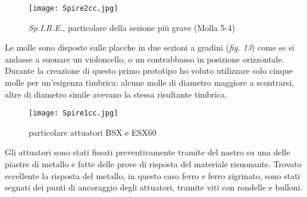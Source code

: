 \begin{figure}[htbp]
\begin{center}
\texttt{[image: Spire2cc.jpg]}
\caption{\textit{Sp.I.R.E.}, particolare della sezione più grave (Molla 5-4)}
\label{default}
\end{center}
\end{figure}

Le molle sono disposte sulle placche in due sezioni a gradini (\textit{fig. 13}) come se si andasse a suonare un violoncello, o un contrabbasso in posizione orizzontale. Durante la creazione di questo primo prototipo ho voluto utilizzare solo cinque molle per un'esigenza timbrica: alcune molle di diametro maggiore a scontrarsi, altre di diametro simile avevano la stessa risultante timbrica. 

\begin{figure}[t]
\begin{center}
\texttt{[image: Spire1cc.jpg]}
\caption{particolare attuatori BSX e ESX60}
\label{default}
\end{center}
\end{figure}

Gli attuatori sono stati fissati preventivamente tramite del nastro su una delle piastre di metallo e fatte delle prove di risposta del materiale risuonante. Trovato eccellente la risposta del metallo, in questo caso ferro e ferro zigrinato, sono stati segnati dei punti di ancoraggio degli attuatori, tramite viti con rondelle e bulloni.

\clearpage 

